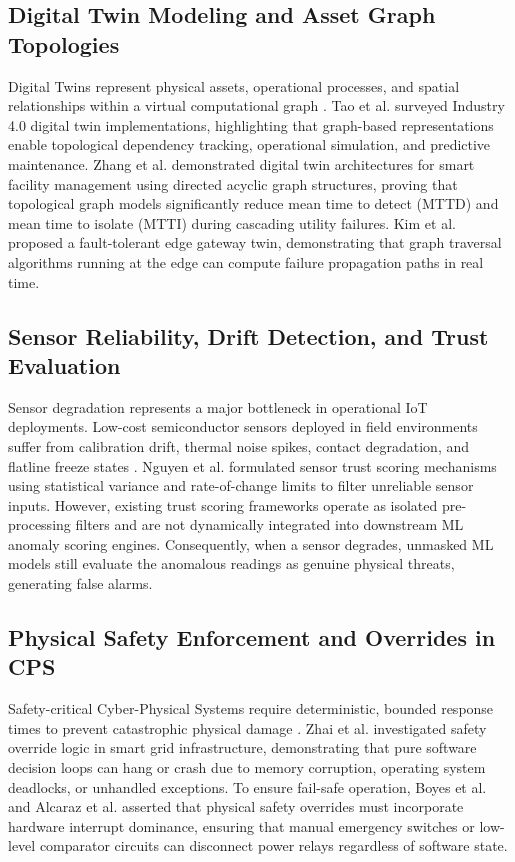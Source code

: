 \documentclass[conference]{IEEEtran}
\begin{document}
\subsection{Digital Twin Modeling and Asset Graph Topologies}
Digital Twins represent physical assets, operational processes, and spatial relationships within a virtual computational graph \cite{b2, b15}. Tao et al. \cite{b2} surveyed Industry 4.0 digital twin implementations, highlighting that graph-based representations enable topological dependency tracking, operational simulation, and predictive maintenance. Zhang et al. \cite{b15} demonstrated digital twin architectures for smart facility management using directed acyclic graph structures, proving that topological graph models significantly reduce mean time to detect (MTTD) and mean time to isolate (MTTI) during cascading utility failures. Kim et al. \cite{b19} proposed a fault-tolerant edge gateway twin, demonstrating that graph traversal algorithms running at the edge can compute failure propagation paths in real time.

\subsection{Sensor Reliability, Drift Detection, and Trust Evaluation}
Sensor degradation represents a major bottleneck in operational IoT deployments. Low-cost semiconductor sensors deployed in field environments suffer from calibration drift, thermal noise spikes, contact degradation, and flatline freeze states \cite{b11, b16}. Nguyen et al. \cite{b16} formulated sensor trust scoring mechanisms using statistical variance and rate-of-change limits to filter unreliable sensor inputs. However, existing trust scoring frameworks operate as isolated pre-processing filters and are not dynamically integrated into downstream ML anomaly scoring engines. Consequently, when a sensor degrades, unmasked ML models still evaluate the anomalous readings as genuine physical threats, generating false alarms.

\subsection{Physical Safety Enforcement and Overrides in CPS}
Safety-critical Cyber-Physical Systems require deterministic, bounded response times to prevent catastrophic physical damage \cite{b3, b12, b17}. Zhai et al. \cite{b17} investigated safety override logic in smart grid infrastructure, demonstrating that pure software decision loops can hang or crash due to memory corruption, operating system deadlocks, or unhandled exceptions. To ensure fail-safe operation, Boyes et al. \cite{b11} and Alcaraz et al. \cite{b3} asserted that physical safety overrides must incorporate hardware interrupt dominance, ensuring that manual emergency switches or low-level comparator circuits can disconnect power relays regardless of software state.
\end{document}
